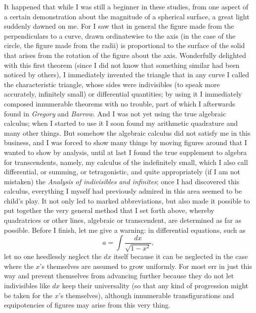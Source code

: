 \documentclass[twoside,openright]{article}
\begin{document}
It happened that while I was still a beginner in these studies, from
one aspect of a certain demonstration about the magnitude of a
spherical surface, a great light suddenly dawned on me. For I saw that
in general the figure made from the perpendiculars to a curve, drawn
ordinatewise to the axis (in the case of the circle, the figure made
from the radii) is proportional to the surface of the solid that
arises from the rotation of the figure about the axis. Wonderfully delighted with this first
theorem (since I did not know that something similar had been noticed
by others), I immediately invented the triangle that in any curve I
called the characteristic triangle, whose sides were indivisibles (to
speak more accurately, infinitely small) or differential quantities;
by using it I immediately composed innumerable theorems with no
trouble, part of which I afterwards found in {\em Gregory} and {\em
  Barrow}.  And I was not yet using the true algebraic calculus; when
I started to use it I soon found my arithmetic quadrature and many
other things.  But somehow the algebraic calculus did not satisfy me
in this business, and I was forced to show many things by moving
figures around that I wanted to show by analysis, until at last I
found the true supplement to algebra for transcendents, namely, my
calculus of the indefinitely small, which I also call differential, or
summing, or tetragonistic, and quite appropriately (if I am not
mistaken) the {\em Analysis of indivisibles and infinites}; once I had
discovered this calculus, everything I myself had previously admired
in this area seemed to be child's play.  It not only led to marked
abbreviations, but also made it possible to put together the very
general method that I set forth above, whereby quadratrices or other
lines, algebraic or transcendent,\label{quadothalg} are determined as
far as possible.  Before I finish, let me give a warning: in
differential equations, such as
$$a= \int\!\frac{dx}{\sqrt{1-x^2}},$$\label{rgcircarc}%
let no one heedlessly neglect the $dx$ itself because it can be
neglected in the case where the $x$'s themselves are assumed to grow
uniformly.  For most err in just this way and prevent themselves from
advancing further because they do not let indivisibles like $dx$ keep
their universality (so that any kind of progression might be taken for
the $x$'s themselves), although innumerable transfigurations and
equipotencies of figures may arise from this very
thing.
\end{document}

